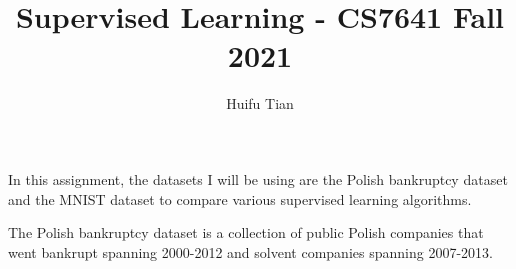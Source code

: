 \documentclass{article}
\title{Supervised Learning - CS7641 Fall 2021}
\author{Huifu Tian}
\begin{document}
\maketitle


In this assignment, the datasets I will be using are the Polish bankruptcy dataset and the MNIST dataset to compare various supervised learning algorithms.

The Polish bankruptcy dataset is a collection of public Polish companies that went bankrupt spanning 2000-2012 and solvent companies spanning 2007-2013.
\end{document}
